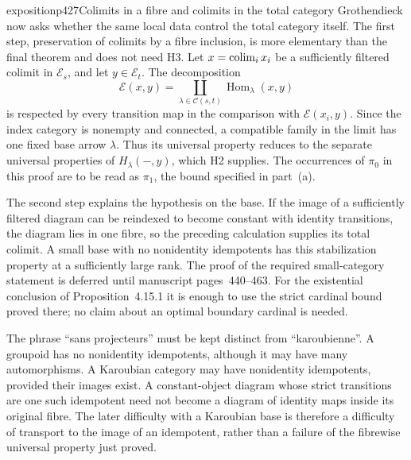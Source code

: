 \begin{dcomment}{exposition}{p427}{Colimits in a fibre and colimits in the total category}
Grothendieck now asks whether the same local data control the total category itself. The first step, preservation of colimits by a fibre inclusion, is more elementary than the final theorem and does not need H3. Let $x=\mathop{\rm colim}_i x_i$ be a sufficiently filtered colimit in $\mathcal E_s$, and let $y\in\mathcal E_t$. The decomposition
\[
 \mathcal E(x,y)=
 \coprod_{\lambda\in\mathcal C(s,t)}
       \operatorname{Hom}_\lambda(x,y)
\]
is respected by every transition map in the comparison with $\mathcal E(x_i,y)$. Since the index category is nonempty and connected, a compatible family in the limit has one fixed base arrow $\lambda$. Thus its universal property reduces to the separate universal properties of $H_\lambda(-,y)$, which H2 supplies. The occurrences of $\pi_0$ in this proof are to be read as $\pi_1$, the bound specified in part~(a).

The second step explains the hypothesis on the base. If the image of a sufficiently filtered diagram can be reindexed to become constant with identity transitions, the diagram lies in one fibre, so the preceding calculation supplies its total colimit. A small base with no nonidentity idempotents has this stabilization property at a sufficiently large rank. The proof of the required small-category statement is deferred until manuscript pages~440--463. For the existential conclusion of Proposition~4.15.1 it is enough to use the strict cardinal bound proved there; no claim about an optimal boundary cardinal is needed.

The phrase ``sans projecteurs'' must be kept distinct from ``karoubienne''. A groupoid has no nonidentity idempotents, although it may have many automorphisms. A Karoubian category may have nonidentity idempotents, provided their images exist. A constant-object diagram whose strict transitions are one such idempotent need not become a diagram of identity maps inside its original fibre. The later difficulty with a Karoubian base is therefore a difficulty of transport to the image of an idempotent, rather than a failure of the fibrewise universal property just proved.
\end{dcomment}

